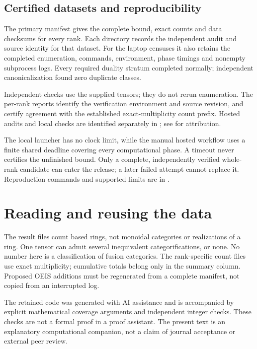 \documentclass[11pt,a4paper]{article}
\theoremstyle{definition}\newtheorem{definition}[theorem]{Definition}\newtheorem{remark}[theorem]{Remark}
\begin{document}
\subsection{Certified datasets and reproducibility}
The primary manifest gives the complete bound, exact counts and data checksums
for every rank. Each  directory records the independent
audit and source identity for that dataset. For the laptop censuses it also
retains the completed enumeration, commands, environment, phase timings and
nonempty subprocess logs. Every required duality stratum completed normally;
independent canonicalization found zero duplicate classes.

Independent checks use the supplied tensors; they do not rerun enumeration.
The per-rank reports identify the verification environment and source revision,
and certify agreement with the established exact-multiplicity count prefix.
Hosted audits and local checks are identified separately in
; see  for attribution.

The local launcher has no clock limit, while the manual hosted workflow uses a
finite shared deadline covering every computational phase. A timeout never
certifies the unfinished bound. Only a complete, independently verified whole-rank
candidate can enter the release; a later failed attempt cannot replace it.
Reproduction commands and supported limits are in .

\section{Reading and reusing the data}
The result files count based rings, not monoidal categories or realizations of
a ring. One tensor can admit several inequivalent categorifications, or none.
No number here is a classification of fusion categories. The rank-specific
count files use exact multiplicity; cumulative totals belong only in the
summary column. Proposed OEIS additions must be regenerated from a complete
manifest, not copied from an interrupted log.

The retained code was generated with AI assistance and is accompanied by explicit
mathematical coverage arguments and independent integer checks. These checks
are not a formal proof in a proof assistant. The present text is an explanatory
computational companion, not a claim of journal acceptance or external peer review.
\end{document}
